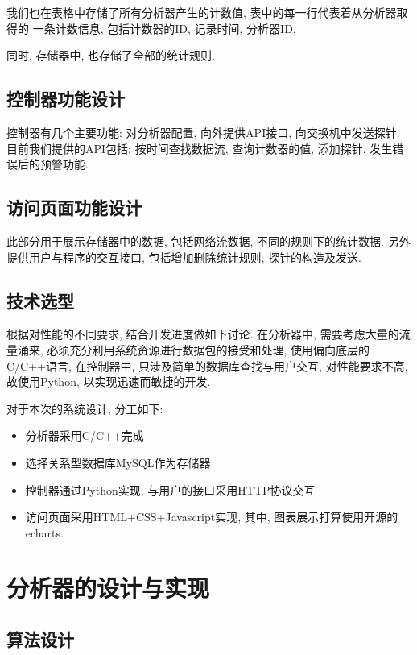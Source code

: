 我们也在表格中存储了所有分析器产生的计数值, 表中的每一行代表着从分析器取得的
一条计数信息, 包括计数器的ID, 记录时间, 分析器ID.

同时, 存储器中, 也存储了全部的统计规则.

\section{控制器功能设计}

控制器有几个主要功能: 对分析器配置, 向外提供API接口, 向交换机中发送探针.
目前我们提供的API包括: 按时间查找数据流, 查询计数器的值, 添加探针,
发生错误后的预警功能.

\section{访问页面功能设计}

此部分用于展示存储器中的数据, 包括网络流数据, 不同的规则下的统计数据.
另外提供用户与程序的交互接口, 包括增加删除统计规则, 探针的构造及发送.

\section{技术选型}

根据对性能的不同要求, 结合开发进度做如下讨论. 在分析器中,
需要考虑大量的流量涌来, 必须充分利用系统资源进行数据包的接受和处理,
使用偏向底层的C/C++语言, 在控制器中, 只涉及简单的数据库查找与用户交互,
对性能要求不高, 故使用Python, 以实现迅速而敏捷的开发.

对于本次的系统设计, 分工如下:

\begin{itemize}
\item
  分析器采用C/C++完成
\item
  选择关系型数据库MySQL作为存储器
\item
  控制器通过Python实现, 与用户的接口采用HTTP协议交互
\item
  访问页面采用HTML+CSS+Javascript实现,
  其中, 图表展示打算使用开源的echarts.
\end{itemize}

\chapter{分析器的设计与实现}

\section{算法设计}
\label{sec:分析器主要算法说明}

